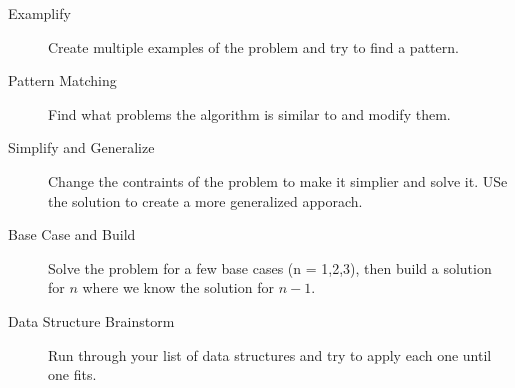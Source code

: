 \documentclass{article}
\begin{document}
		\begin{description}
			\item[Examplify] Create multiple examples of the problem and try to find a pattern. \par
			\item[Pattern Matching] Find what problems the algorithm is similar to and modify them. \par

			\item[Simplify and Generalize] Change the contraints of the problem to make it simplier and solve it. USe the solution to create a more generalized apporach. \par

			\item[Base Case and Build] Solve the problem for a few base cases (n = 1,2,3), then build a solution for $n$ where we know the solution for $n - 1$.
			\item[Data Structure Brainstorm] Run through your list of data structures and try to apply each one until one fits.
		\end{description}
\end{document}
